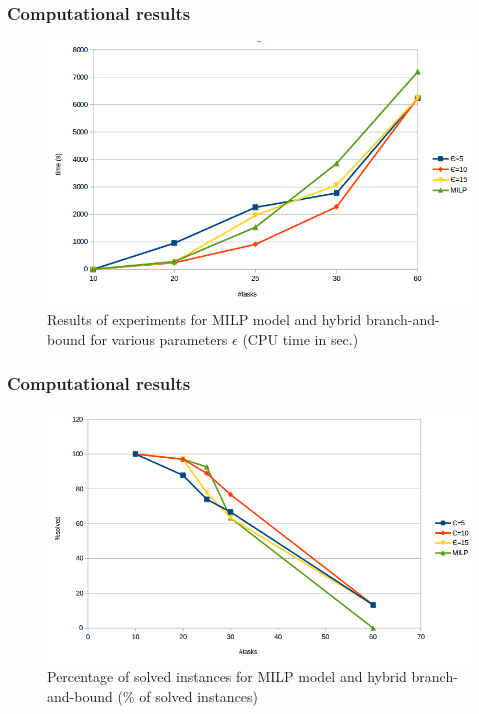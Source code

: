 \begin{frame}
  \frametitle{Computational results}
  \begin{figure}[!htb]
    \centering
    \includegraphics[width=0.9\linewidth]{figures/BB_time.png}
    \caption{Results of experiments for MILP model and hybrid branch-and-bound 
      for various parameters $\epsilon$ (CPU time in sec.)}
  \end{figure}

\end{frame}


\begin{frame}
  \frametitle{Computational results}
  \begin{figure}[!htb]
    \centering
    \includegraphics[width=0.9\linewidth]{figures/BB_solved.png}
    \caption{Percentage of solved instances for MILP model and hybrid 
      branch-and-bound (\% of solved instances)}
  \end{figure}
  \vfill
\end{frame}